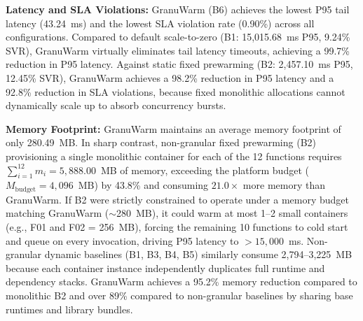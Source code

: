 \documentclass[final,5p,times,twocolumn]{elsarticle}
\begin{document}
\begin{table}[htbp]
\centering
\caption{Overall Benchmark Performance Across Baselines (Mean Values)}
\label{tab:overall_perf}
\end{table}

\textbf{Latency and SLA Violations:} GranuWarm (B6) achieves the lowest P95 tail latency (43.24~ms) and the lowest SLA violation rate (0.90\%) across all configurations. Compared to default scale-to-zero (B1: 15,015.68~ms P95, 9.24\% SVR), GranuWarm virtually eliminates tail latency timeouts, achieving a 99.7\% reduction in P95 latency. Against static fixed prewarming (B2: 2,457.10~ms P95, 12.45\% SVR), GranuWarm achieves a 98.2\% reduction in P95 latency and a 92.8\% reduction in SLA violations, because fixed monolithic allocations cannot dynamically scale up to absorb concurrency bursts.

\textbf{Memory Footprint:} GranuWarm maintains an average memory footprint of only 280.49~MB. In sharp contrast, non-granular fixed prewarming (B2) provisioning a single monolithic container for each of the 12 functions requires $\sum_{i=1}^{12} m_i = 5,888.00$~MB of memory, exceeding the platform budget ($M_{\text{budget}} = 4,096$~MB) by 43.8\% and consuming $21.0\times$ more memory than GranuWarm. If B2 were strictly constrained to operate under a memory budget matching GranuWarm ($\sim$280~MB), it could warm at most 1--2 small containers (e.g., F01 and F02 = 256~MB), forcing the remaining 10 functions to cold start and queue on every invocation, driving P95 latency to $>15,000$~ms. Non-granular dynamic baselines (B1, B3, B4, B5) similarly consume 2,794--3,225~MB because each container instance independently duplicates full runtime and dependency stacks. GranuWarm achieves a 95.2\% memory reduction compared to monolithic B2 and over 89\% compared to non-granular baselines by sharing base runtimes and library bundles.
\end{document}
